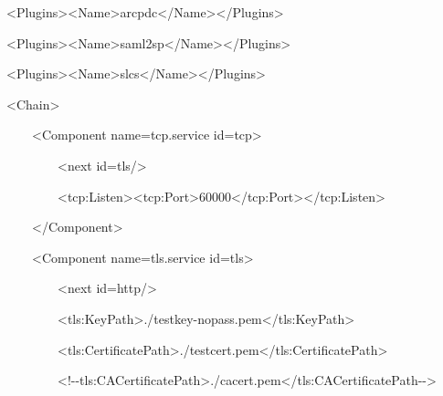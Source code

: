 \documentclass{article}
\begin{document}
{\ttfamily\color{black}
\ \ \ \ {\textless}Plugins{\textgreater}{\textless}Name{\textgreater}arcpdc{\textless}/Name{\textgreater}{\textless}/Plugins{\textgreater}
}

{\ttfamily\color{black}
\ \ \ \ {\textless}Plugins{\textgreater}{\textless}Name{\textgreater}saml2sp{\textless}/Name{\textgreater}{\textless}/Plugins{\textgreater}
}

{\ttfamily\color{black}
\ \ \ \ {\textless}Plugins{\textgreater}{\textless}Name{\textgreater}slcs{\textless}/Name{\textgreater}{\textless}/Plugins{\textgreater}
}

{\ttfamily\color{black}
\ \ \ \ {\textless}Chain{\textgreater} }

{\ttfamily\color{black}
\ \ \ \ \ \ \ \ {\textless}Component
name={\textquotedbl}tcp.service{\textquotedbl}
id={\textquotedbl}tcp{\textquotedbl}{\textgreater} }

{\ttfamily\color{black}
\ \ \ \ \ \ \ \ \ \ \ \ {\textless}next
id={\textquotedbl}tls{\textquotedbl}/{\textgreater} }

{\ttfamily\color{black}
\ \ \ \ \ \ \ \ \ \ \ \ {\textless}tcp:Listen{\textgreater}{\textless}tcp:Port{\textgreater}60000{\textless}/tcp:Port{\textgreater}{\textless}/tcp:Listen{\textgreater}
}

{\ttfamily\color{black}
\ \ \ \ \ \ \ \ {\textless}/Component{\textgreater} }

{\ttfamily\color{black}
\ \ \ \ \ \ \ \ {\textless}Component
name={\textquotedbl}tls.service{\textquotedbl}
id={\textquotedbl}tls{\textquotedbl}{\textgreater} }

{\ttfamily\color{black}
\ \ \ \ \ \ \ \ \ \ \ \ {\textless}next
id={\textquotedbl}http{\textquotedbl}/{\textgreater} }

{\ttfamily\color{black}
\ \ \ \ \ \ \ \ \ \ \ \ {\textless}tls:KeyPath{\textgreater}./testkey-nopass.pem{\textless}/tls:KeyPath{\textgreater}
}

{\ttfamily\color{black}
\ \ \ \ \ \ \ \ \ \ \ \ {\textless}tls:CertificatePath{\textgreater}./testcert.pem{\textless}/tls:CertificatePath{\textgreater}
}

{\ttfamily\color{black}
\ \ \ \ \ \ \ \ \ \ \ \ {\textless}!-{}-tls:CACertificatePath{\textgreater}./cacert.pem{\textless}/tls:CACertificatePath-{}-{\textgreater}
}
\end{document}

